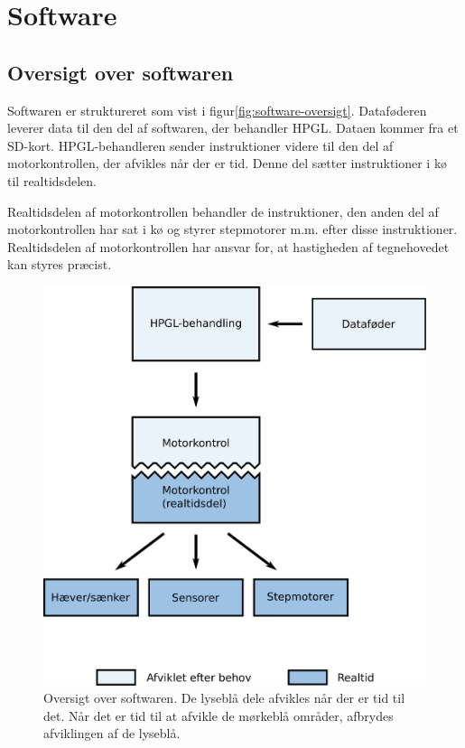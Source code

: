 \chapter[Implementering af software]{Software}



\section{Oversigt over softwaren}


Softwaren er struktureret som vist i
figur\vref{fig:software-oversigt}. Dataføderen leverer data til den
del af softwaren, der behandler HPGL. Dataen kommer fra et
SD-kort. HPGL-behandleren sender instruktioner videre til den del af
motorkontrollen, der afvikles når der er tid. Denne del sætter
instruktioner i kø til realtidsdelen.

Realtidsdelen af motorkontrollen behandler de instruktioner, den anden
del af motorkontrollen har sat i kø og styrer stepmotorer m.m. efter
disse instruktioner. Realtidsdelen af motorkontrollen har ansvar for,
at hastigheden af tegnehovedet kan styres præcist.


\begin{figure}[htbp]
  \centering
  \includegraphics[width=.75\textwidth]{../brugere/kjaergaard/software-oversigt}
  \caption{Oversigt over softwaren. De lyseblå dele afvikles når der
    er tid til det. Når det er tid til at afvikle de mørkeblå områder,
    afbrydes afviklingen af de lyseblå.}
  \label{fig:software-oversigt}
\end{figure}


